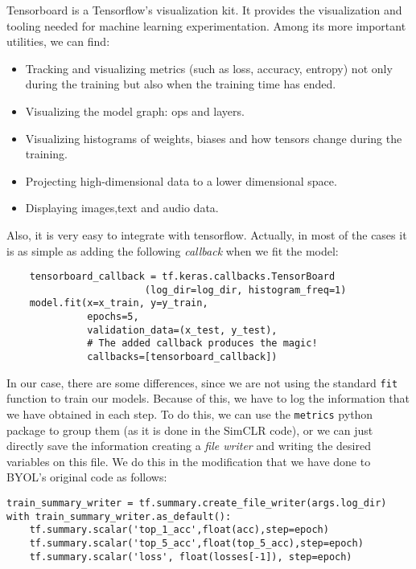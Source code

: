 Tensorboard is a Tensorflow's visualization kit. It provides the visualization and tooling needed for machine learning experimentation. Among its more important utilities, we can find:
\begin{itemize}
\item Tracking and visualizing metrics (such as loss, accuracy, entropy) not only during the training but also when the training time has ended.

\item Visualizing the model graph: ops and layers.

\item Visualizing histograms of weights, biases and how tensors change during the training.

\item Projecting high-dimensional data to a lower dimensional space.

\item Displaying images,text and audio data.
\end{itemize}

Also, it is very easy to integrate with tensorflow.  Actually, in most of the cases it is as simple as adding the following \emph{callback} when we fit the model:

\begin{verbatim}
    tensorboard_callback = tf.keras.callbacks.TensorBoard
                        (log_dir=log_dir, histogram_freq=1)
    model.fit(x=x_train, y=y_train, 
              epochs=5, 
              validation_data=(x_test, y_test),
              # The added callback produces the magic! 
              callbacks=[tensorboard_callback])  
\end{verbatim}

In our case, there are some differences, since we are not using the standard \lstinline{fit} function to train our models. Because of this, we have to log the information that we have obtained in each step. To do this, we can use the \lstinline{metrics} python package to group them (as it is done in the SimCLR code), or we can just directly save the information creating a \emph{file writer} and writing the desired variables on this file. We do this in the modification that we have done to BYOL's original code as follows:

\begin{verbatim}
train_summary_writer = tf.summary.create_file_writer(args.log_dir)
with train_summary_writer.as_default():
    tf.summary.scalar('top_1_acc',float(acc),step=epoch)
    tf.summary.scalar('top_5_acc',float(top_5_acc),step=epoch)
    tf.summary.scalar('loss', float(losses[-1]), step=epoch)
\end{verbatim}


